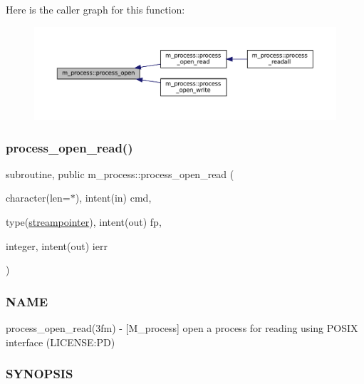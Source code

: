 Here is the caller graph for this function\+:\nopagebreak
\begin{figure}[H]
\begin{center}
\leavevmode
\includegraphics[width=350pt]{namespacem__process_a3c0f543a9ceff2671041d73660f60a59_icgraph}
\end{center}
\end{figure}
\mbox{\label{namespacem__process_aaaf4d1926258a4cec7da7fc61c38c79d}} 
\subsubsection{\texorpdfstring{process\+\_\+open\+\_\+read()}{process\_open\_read()}}
{\footnotesize\ttfamily subroutine, public m\+\_\+process\+::process\+\_\+open\+\_\+read (\begin{DoxyParamCaption}\item[{character(len=$\ast$), intent(in)}]{cmd,  }\item[{type(\mbox{\hyperlink{structm__process_1_1streampointer}{streampointer}}), intent(out)}]{fp,  }\item[{integer, intent(out)}]{ierr }\end{DoxyParamCaption})}



\subsubsection*{N\+A\+ME}

process\+\_\+open\+\_\+read(3fm) -\/ \mbox{[}M\+\_\+process\mbox{]} open a process for reading using P\+O\+S\+IX interface (L\+I\+C\+E\+N\+SE\+:PD) 

\subsubsection*{S\+Y\+N\+O\+P\+S\+IS}


